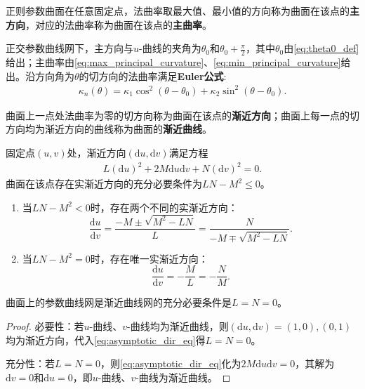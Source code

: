 \documentclass[../../main.tex]{subfiles}%
\begin{document}
\begin{definition}
正则参数曲面在任意固定点，法曲率取最大值、最小值的方向称为曲面在该点的\textbf{主方向}，对应的法曲率称为曲面在该点的\textbf{主曲率}。
\end{definition}

\begin{proposition}
正交参数曲线网下，主方向与$u$-曲线的夹角为$\theta_0$和$\theta_0+\frac{\pi}{2}$，其中$\theta_0$由\eqref{eq:theta0_def}给出；主曲率由\eqref{eq:max_principal_curvature}、\eqref{eq:min_principal_curvature}给出。沿方向角为$\theta$的切方向的法曲率满足\textbf{Euler公式}:
\begin{align}
\kappa_n(\theta)=\kappa_1\cos^2(\theta-\theta_0)+\kappa_2\sin^2(\theta-\theta_0).\label{eq:euler_formula112121}
\end{align}
\end{proposition}

\begin{definition}
曲面上一点处法曲率为零的切方向称为曲面在该点的\textbf{渐近方向}；曲面上每一点的切方向均为渐近方向的曲线称为曲面的\textbf{渐近曲线}。
\end{definition}

固定点$(u,v)$处，渐近方向$(\mathrm{d}u,\mathrm{d}v)$满足方程
\begin{align}
L(\mathrm{d}u)^2+2M\mathrm{d}u\mathrm{d}v+N(\mathrm{d}v)^2=0.\label{eq:asymptotic_dir_eq}
\end{align}
曲面在该点存在实渐近方向的充分必要条件为$LN-M^2\leqslant0$。
\begin{enumerate}[(1)]
\item 当$LN-M^2<0$时，存在两个不同的实渐近方向：
$$\frac{\mathrm{d}u}{\mathrm{d}v}=\frac{-M\pm\sqrt{M^2-LN}}{L}=\frac{N}{-M\mp\sqrt{M^2-LN}}.$$
\item 当$LN-M^2=0$时，存在唯一实渐近方向：
$$\frac{\mathrm{d}u}{\mathrm{d}v}=-\frac{M}{L}=-\frac{N}{M}.$$
\end{enumerate}

\begin{theorem}
曲面上的参数曲线网是渐近曲线网的充分必要条件是$L=N=0$。
\end{theorem}
\begin{proof}

{\heiti 必要性：}若$u$-曲线、$v$-曲线均为渐近曲线，则$(\mathrm{d}u,\mathrm{d}v)=(1,0),(0,1)$均为渐近方向，代入\eqref{eq:asymptotic_dir_eq}得$L=N=0$。

{\heiti 充分性：}若$L=N=0$，则\eqref{eq:asymptotic_dir_eq}化为$2M\mathrm{d}u\mathrm{d}v=0$，其解为$\mathrm{d}v=0$和$\mathrm{d}u=0$，即$u$-曲线、$v$-曲线为渐近曲线。
\end{proof}
\end{document}
